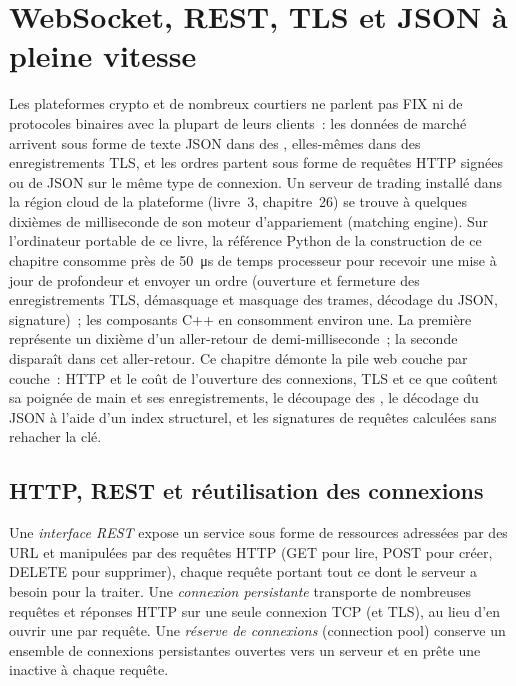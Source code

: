 \chapter{WebSocket, REST, TLS et JSON à pleine vitesse}\label{ch:ll:websocket-rest-tls-and-json-at-speed}

Les plateformes crypto et de nombreux courtiers ne parlent pas FIX ni de protocoles binaires avec la plupart de leurs clients~: les données de marché arrivent sous forme de texte JSON
dans des , elles-mêmes dans des enregistrements TLS, et les ordres partent sous forme de requêtes HTTP signées ou de JSON sur le même type de connexion.
Un serveur de trading installé dans la région cloud de la plateforme (livre~3, chapitre~26) se trouve à quelques dixièmes de milliseconde de son moteur d'appariement (matching engine).
Sur l'ordinateur portable de ce livre, la référence Python de la construction de ce chapitre consomme près
de \qty{50}{\micro\second} de temps processeur pour recevoir une mise à jour de profondeur et envoyer un ordre (ouverture et fermeture des enregistrements TLS,
démasquage et masquage des trames, décodage du JSON, signature)~; les composants C++ en consomment environ une. La première représente un dixième d'un aller-retour de demi-milliseconde~;
la seconde disparaît dans cet aller-retour. Ce chapitre démonte la pile web couche par couche~: HTTP et le coût de l'ouverture des connexions, TLS et ce que coûtent
sa poignée de main et ses enregistrements, le découpage des , le décodage du JSON
à l'aide d'un index structurel, et les signatures de requêtes calculées sans rehacher la clé.

\section{HTTP, REST et réutilisation des connexions}

\begin{definition}\label{def:ll:websocket-rest-tls-and-json-at-speed:rest}
Une \emph{interface REST} expose un service sous forme de ressources adressées par des URL et manipulées par des requêtes HTTP
(GET pour lire, POST pour créer, DELETE pour supprimer), chaque requête portant tout ce dont le serveur a besoin pour la traiter. Une \emph{connexion persistante} transporte
de nombreuses requêtes et réponses HTTP sur une seule connexion TCP (et TLS), au lieu d'en ouvrir une par requête. Une \emph{réserve de connexions} (connection pool)
conserve un ensemble de connexions persistantes ouvertes vers un serveur
et en prête une inactive à chaque requête.
\end{definition}

